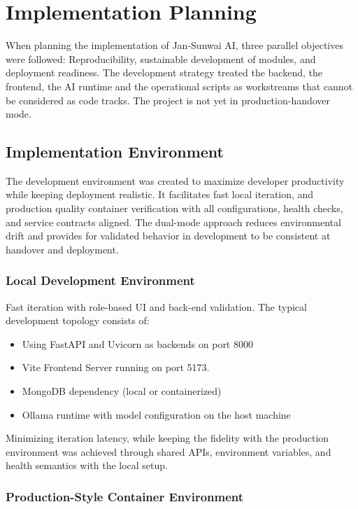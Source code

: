 \chapter{Implementation Planning}

When planning the implementation of Jan-Sunwai AI, three parallel objectives were followed: Reproducibility, sustainable development of modules, and deployment readiness. The development strategy treated the backend, the frontend, the AI runtime and the operational scripts as workstreams that cannot be considered as code tracks. The project is not yet in production-handover mode.

\section{Implementation Environment}

The development environment was created to maximize developer productivity while keeping deployment realistic. It facilitates fast local iteration, and production quality container verification with all configurations, health checks, and service contracts aligned. The dual-mode approach reduces environmental drift and provides for validated behavior in development to be consistent at handover and deployment.

\subsection{Local Development Environment}

Fast iteration with role-based UI and back-end validation. The typical development topology consists of:

\begin{itemize}
\item Using FastAPI and Uvicorn as backends on port 8000
\item Vite Frontend Server running on port 5173.
\item MongoDB dependency (local or containerized)
\item Ollama runtime with model configuration on the host machine
\end{itemize}

Minimizing iteration latency, while keeping the fidelity with the production environment was achieved through shared APIs, environment variables, and health semantics with the local setup.

\subsection{Production-Style Container Environment}


